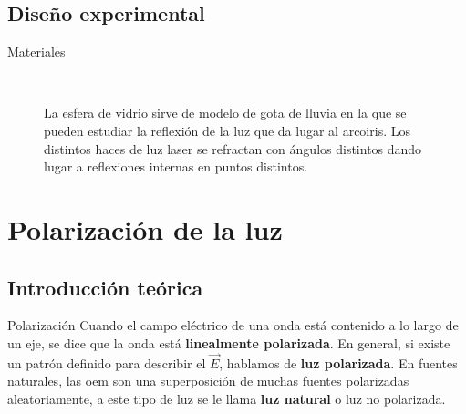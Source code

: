 \documentclass[]{presentation}
\begin{document}
\subsection{Diseño experimental}
\begin{frame}{Materiales}
\begin{figure}
	\centering
	\,
	\,
	\caption{La esfera de vidrio sirve de modelo de gota de lluvia en la que se pueden estudiar la reflexión de la luz que da lugar al arcoiris. Los distintos haces de luz laser se refractan con ángulos distintos dando lugar a reflexiones internas en puntos distintos.}
\end{figure}
\end{frame}

\section{Polarización de la luz}
\subsection{Introducción teórica}
\begin{frame}{Polarización}
	Cuando el campo eléctrico de una onda está contenido a lo largo de un eje, se dice que la onda está \textbf{linealmente polarizada}.
	En general, si existe un patrón definido para describir el $\vec{E}$, hablamos de \textbf{luz polarizada}. En fuentes naturales, las oem son una superposición de muchas fuentes polarizadas aleatoriamente, a este tipo de luz se le llama \textbf{luz natural} o luz no polarizada.
\end{frame}
\end{document}
